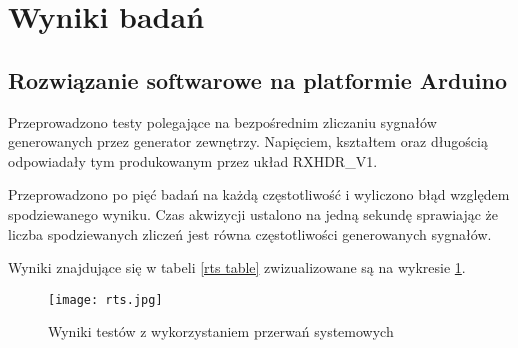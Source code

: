 \section{Wyniki badań}

\subsection{Rozwiązanie softwarowe na platformie Arduino}

Przeprowadzono testy polegające na bezpośrednim zliczaniu sygnałów generowanych przez generator zewnętrzy. 
Napięciem, kształtem oraz długością odpowiadały tym produkowanym przez układ RXHDR\_V1.

Przeprowadzono po pięć badań na każdą częstotliwość i wyliczono błąd względem spodziewanego wyniku. 
Czas akwizycji ustalono na jedną sekundę sprawiając że liczba spodziewanych zliczeń jest równa częstotliwości generowanych sygnałów.

Wyniki znajdujące się w tabeli \ref{rts table} zwizualizowane są na wykresie \ref{rts wyniki}.


\begin{figure}[]
        \centering
        \texttt{[image: rts.jpg]}
        \caption{Wyniki testów z wykorzystaniem przerwań systemowych}
        \label{rts wyniki}
\end{figure}

